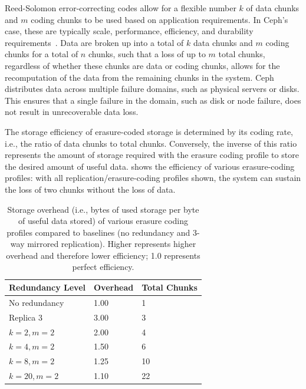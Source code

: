 Reed-Solomon error-correcting codes allow for a flexible number $k$ of data chunks and $m$ coding chunks to be used based on application requirements. In Ceph's case, these are typically scale, performance, efficiency, and durability requirements~\cite{ceph_erasure_code}. Data are broken up into a total of $k$ data chunks and $m$ coding chunks for a total of $n$ chunks, such that a loss of up to $m$ total chunks, regardless of whether these chunks are data or coding chunks, allows for the recomputation of the data from the remaining chunks in the system. Ceph distributes data across multiple failure domains, such as physical servers or disks. This ensures that a single failure in the domain, such as disk or node failure, does not result in unrecoverable data loss.

The storage efficiency of erasure-coded storage is determined by its coding rate, i.e., the ratio of data chunks to total chunks. Conversely, the inverse of this ratio represents the amount of storage required with the erasure coding profile to store the desired amount of useful data.  shows the efficiency of various erasure-coding profiles: with all replication/erasure-coding profiles shown, the system can sustain the loss of two chunks without the loss of data.

\begin{table}[H]
\centering
\begin{tabular}{|lll|}
\hline
\textbf{Redundancy Level} & \textbf{Overhead} & \textbf{Total Chunks} \\
\hline
No redundancy & 1.00 & 1 \\
\hline
Replica 3 & 3.00 & 3 \\
$k=2, m=2$ & 2.00 & 4 \\
$k=4, m=2$ & 1.50 & 6 \\
$k=8, m=2$ & 1.25 & 10 \\
$k=20, m=2$ & 1.10 & 22 \\
\hline
\end{tabular}

\caption[Storage Overhead of Erasure-Coding Profiles]{Storage overhead (i.e., bytes of used storage per byte of useful data stored) of various erasure coding profiles compared to baselines (no redundancy and 3-way mirrored replication). Higher represents higher overhead and therefore lower efficiency; 1.0 represents perfect efficiency.}
\label{tbl:ec-profiles}
\end{table}

